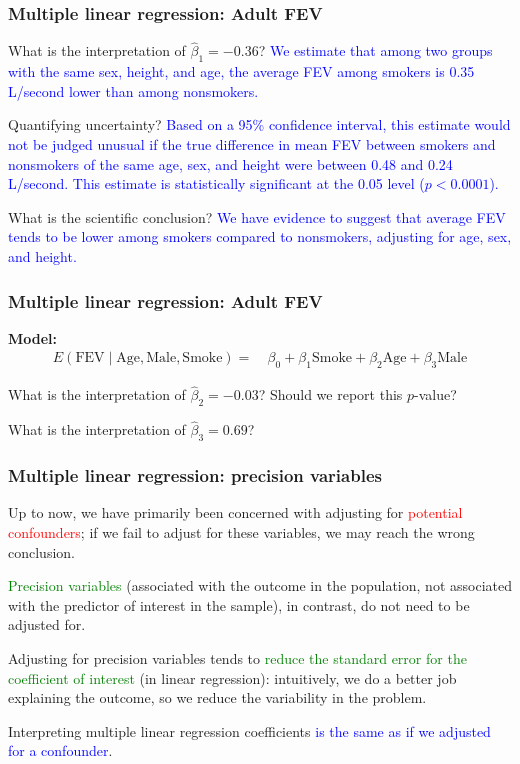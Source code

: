 \documentclass[12pt, 
hyperref={colorlinks=true, linkcolor=blue, urlcolor=cyan}]{beamer}
\begin{document}
\begin{frame}
\frametitle{Multiple linear regression: Adult FEV}

What is the interpretation of $\hat{\beta}_1 = -0.36$? \pause \textcolor{blue}{We estimate that among two groups with the same sex, height, and age, the average FEV among smokers is 0.35 L/second lower than among nonsmokers.}

Quantifying uncertainty? \pause \textcolor{blue}{Based on a 95\% confidence interval, this estimate would not be judged unusual if the true difference in mean FEV between smokers and nonsmokers of the same age, sex, and height were between 0.48 and 0.24 L/second. This estimate is statistically significant at the 0.05 level ($p < 0.0001$).}

What is the scientific conclusion? \pause \textcolor{blue}{We have evidence to suggest that average FEV tends to be lower among smokers compared to nonsmokers, adjusting for age, sex, and height.}
\end{frame}

\begin{frame}
\frametitle{Multiple linear regression: Adult FEV}
\vspace{-1cm}\textbf{Model:} {\small \begin{align*}
E(\text{FEV} \mid \text{Age}, \text{Male}, \text{Smoke}) =& \ \beta_0 + \beta_1 \text{Smoke} + \beta_2 \text{Age} + \beta_3 \text{Male} 
\end{align*} } \vspace{-1cm}

What is the interpretation of $\hat{\beta}_2 = -0.03$? Should we report this $p$-value? \vspace{1.5cm}

What is the interpretation of $\hat{\beta}_3 = 0.69$? \vspace{1.5cm}

\end{frame}

\begin{frame}
\frametitle{Multiple linear regression: precision variables}

Up to now, we have primarily been concerned with adjusting for \textcolor{red}{potential confounders}; if we fail to adjust for these variables, we may reach the wrong conclusion.

\textcolor{green}{Precision variables} (associated with the outcome in the population, not associated with the predictor of interest in the sample), in contrast, do not need to be adjusted for.

Adjusting for precision variables tends to \textcolor{green}{reduce the standard error for the coefficient of interest} (in linear regression): intuitively, we do a better job explaining the outcome, so we reduce the variability in the problem. 

Interpreting multiple linear regression coefficients \textcolor{blue}{is the same as if we adjusted for a confounder}.
\end{frame}
\end{document}
